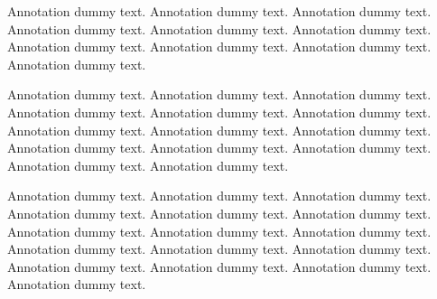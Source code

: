 Annotation dummy text. Annotation dummy text. Annotation dummy text. Annotation dummy text. Annotation dummy text. Annotation dummy text. Annotation dummy text. Annotation dummy text. Annotation dummy text. Annotation dummy text. 
\par
Annotation dummy text. Annotation dummy text. Annotation dummy text. Annotation dummy text. Annotation dummy text. 
Annotation dummy text. Annotation dummy text. Annotation dummy text. Annotation dummy text. 
Annotation dummy text. Annotation dummy text. Annotation dummy text. Annotation dummy text. Annotation dummy text. 
\par
Annotation dummy text. Annotation dummy text. Annotation dummy text. Annotation dummy text. Annotation dummy text. Annotation dummy text. Annotation dummy text. Annotation dummy text. Annotation dummy text. Annotation dummy text. Annotation dummy text. Annotation dummy text. Annotation dummy text. Annotation dummy text. Annotation dummy text. Annotation dummy text.